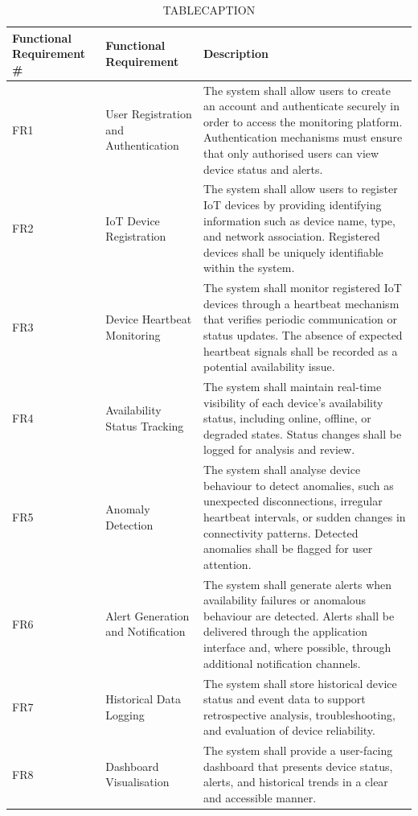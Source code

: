 \begin{table}[htbp]
  \centering
  \small
  \caption{TABLECAPTION}
  \label{tab:ICA1PLACEHOLDER}
\begin{tabular}{p{}p{}p{}}
\toprule
Functional Requirement \# & Functional Requirement & Description \\
\midrule
FR1 & User Registration and Authentication & The system shall allow users to create an account and authenticate securely in order to access the monitoring platform. Authentication mechanisms must ensure that only authorised users can view device status and alerts. \\
\midrule
FR2 & IoT Device Registration & The system shall allow users to register IoT devices by providing identifying information such as device name, type, and network association. Registered devices shall be uniquely identifiable within the system. \\
\midrule
FR3 & Device Heartbeat Monitoring & The system shall monitor registered IoT devices through a heartbeat mechanism that verifies periodic communication or status updates. The absence of expected heartbeat signals shall be recorded as a potential availability issue. \\
\midrule
FR4 & Availability Status Tracking & The system shall maintain real-time visibility of each device's availability status, including online, offline, or degraded states. Status changes shall be logged for analysis and review. \\
\midrule
FR5 & Anomaly Detection & The system shall analyse device behaviour to detect anomalies, such as unexpected disconnections, irregular heartbeat intervals, or sudden changes in connectivity patterns. Detected anomalies shall be flagged for user attention. \\
\midrule
FR6 & Alert Generation and Notification & The system shall generate alerts when availability failures or anomalous behaviour are detected. Alerts shall be delivered through the application interface and, where possible, through additional notification channels. \\
\midrule
FR7 & Historical Data Logging & The system shall store historical device status and event data to support retrospective analysis, troubleshooting, and evaluation of device reliability. \\
\midrule
FR8 & Dashboard Visualisation & The system shall provide a user-facing dashboard that presents device status, alerts, and historical trends in a clear and accessible manner. \\
\bottomrule
\end{tabular}
\end{table}

